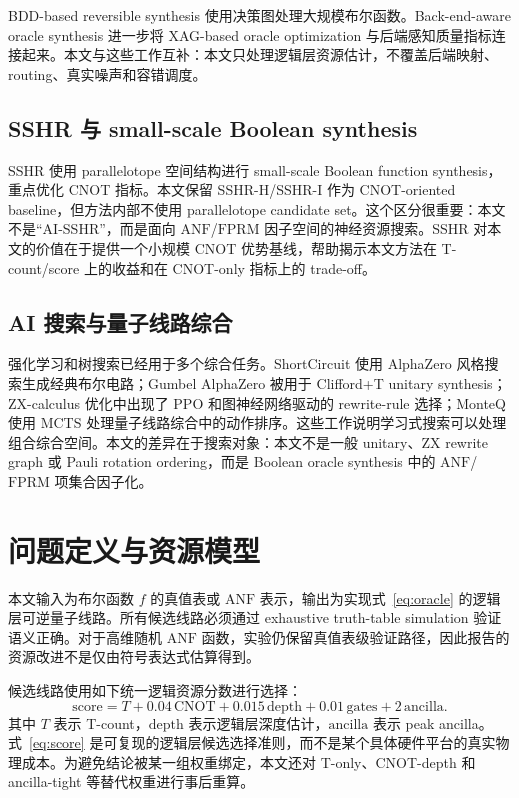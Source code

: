 \documentclass[UTF8,fontset=macnew,11pt]{ctexart}
\newcommand{\score}{\ensuremath{\mathrm{score}}}
\newcommand{\anf}{\ensuremath{\mathrm{ANF}}}
\newcommand{\fprm}{\ensuremath{\mathrm{FPRM}}}
\begin{document}
BDD-based reversible synthesis 使用决策图处理大规模布尔函数\cite{wille2009bdd}。Back-end-aware oracle synthesis 进一步将 XAG-based oracle optimization 与后端感知质量指标连接起来\cite{yu2025backend}。本文与这些工作互补：本文只处理逻辑层资源估计，不覆盖后端映射、routing、真实噪声和容错调度。

\subsection{SSHR 与 small-scale Boolean synthesis}

SSHR 使用 parallelotope 空间结构进行 small-scale Boolean function synthesis，重点优化 CNOT 指标\cite{zheng2025sshr}。本文保留 SSHR-H/SSHR-I 作为 CNOT-oriented baseline，但方法内部不使用 parallelotope candidate set。这个区分很重要：本文不是“AI-SSHR”，而是面向 \anf{}/\fprm{} 因子空间的神经资源搜索。SSHR 对本文的价值在于提供一个小规模 CNOT 优势基线，帮助揭示本文方法在 T-count/score 上的收益和在 CNOT-only 指标上的 trade-off。

\subsection{AI 搜索与量子线路综合}

强化学习和树搜索已经用于多个综合任务。ShortCircuit 使用 AlphaZero 风格搜索生成经典布尔电路\cite{tsaras2024shortcircuit}；Gumbel AlphaZero 被用于 Clifford+T unitary synthesis\cite{rietsch2024unitary}；ZX-calculus 优化中出现了 PPO 和图神经网络驱动的 rewrite-rule 选择\cite{riu2025zx}；MonteQ 使用 MCTS 处理量子线路综合中的动作排序\cite{machiya2026monteq}。这些工作说明学习式搜索可以处理组合综合空间。本文的差异在于搜索对象：本文不是一般 unitary、ZX rewrite graph 或 Pauli rotation ordering，而是 Boolean oracle synthesis 中的 \anf{}/\fprm{} 项集合因子化。

\section{问题定义与资源模型}

本文输入为布尔函数 $f$ 的真值表或 \anf{} 表示，输出为实现式~\eqref{eq:oracle} 的逻辑层可逆量子线路。所有候选线路必须通过 exhaustive truth-table simulation 验证语义正确。对于高维随机 \anf{} 函数，实验仍保留真值表级验证路径，因此报告的资源改进不是仅由符号表达式估算得到。

候选线路使用如下统一逻辑资源分数进行选择：
\begin{equation}
  \score = T + 0.04\,\mathrm{CNOT} + 0.015\,\mathrm{depth}
         + 0.01\,\mathrm{gates} + 2\,\mathrm{ancilla}.
  \label{eq:score}
\end{equation}
其中 $T$ 表示 T-count，$\mathrm{depth}$ 表示逻辑层深度估计，$\mathrm{ancilla}$ 表示 peak ancilla。式~\eqref{eq:score} 是可复现的逻辑层候选选择准则，而不是某个具体硬件平台的真实物理成本。为避免结论被某一组权重绑定，本文还对 T-only、CNOT-depth 和 ancilla-tight 等替代权重进行事后重算。
\end{document}
